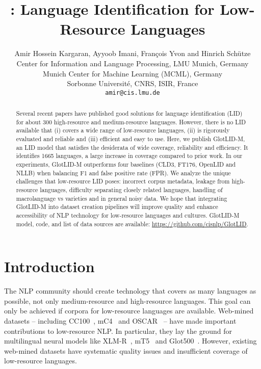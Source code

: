 \documentclass[11pt]{article}
\title{\genericname: Language Identification for
  Low-Resource Languages}
\author{Amir Hossein Kargaran, Ayyoob Imani, François Yvon and Hinrich Schütze \\
        Center for Information and Language Processing, LMU Munich, Germany \\
        Munich Center for Machine Learning (MCML), Germany \\
        Sorbonne Université, CNRS, ISIR, France \protect \\
        \texttt{amir@cis.lmu.de}
}
\def\numberlanguagesaccurate{1665\xspace}
\def\numlangslidcommunity{300\xspace}
\def\modelname{\mbox{GlotLID-M}\xspace}
\def\macrolanguage{macrolanguage\xspace}
\def\ft176{FT176\xspace}
\def\edin{OpenLID\xspace}
\def\nllb{NLLB\xspace}
\begin{document}
\maketitle
\begin{abstract}
Several recent papers have published good solutions for
language identification (LID) for about \numlangslidcommunity high-resource
and medium-resource languages. However, there is no LID
available that (i) covers a wide range of low-resource languages, (ii)
is rigorously evaluated and reliable and (iii) efficient and
easy to use.  Here, we publish \modelname, an LID model that
satisfies the desiderata of wide coverage, reliability and
efficiency.  It identifies \numberlanguagesaccurate
languages, a large increase in coverage compared to prior work. In our experiments, \modelname
outperforms
four baselines (CLD3, \ft176, \edin and \nllb) when
balancing F1 and false positive rate (FPR).
We analyze
the unique challenges that
low-resource LID poses: incorrect corpus metadata, leakage
from high-resource languages, difficulty separating closely
related languages, handling of \macrolanguage vs varieties
and in general noisy data.  We hope that
integrating \modelname into dataset creation pipelines will
improve quality and enhance accessibility of NLP technology
for low-resource languages and cultures. \modelname model, code, and list of data sources are available: \url{https://github.com/cisnlp/GlotLID}.
\end{abstract}



\section{Introduction}
The NLP community should 
create technology that covers as many languages as possible,
not only medium-resource and high-resource languages.  This
goal can only be achieved if corpora for low-resource
languages are available.  Web-mined datasets -- including
CC100~\cite{wenzek-etal-2020-ccnet}, mC4~\cite{xue-etal-2021-mt5}
and OSCAR~\cite{AbadjiOrtizSuarezRomaryetal.2021,
OrtizSuarezSagotRomary2019} -- have made important
contributions to low-resource NLP. In
particular, they lay the ground for multilingual neural
models like XLM-R~\cite{conneau-etal-2020-unsupervised},
mT5~\cite{xue-etal-2021-mt5} and
Glot500~\cite{imanigooghari-etal-2023-glot500}. However, existing
web-mined datasets have systematic quality issues
\citep{kreutzer-etal-2022-quality} and insufficient coverage of
low-resource languages.
\end{document}
